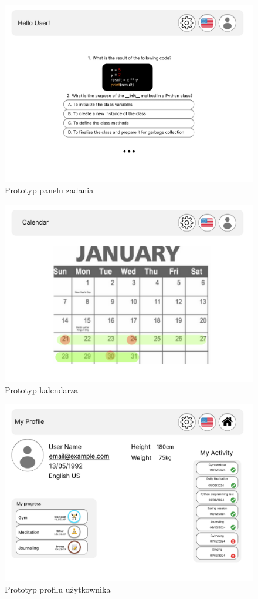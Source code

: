 \begin{figure}[h]
    \centering
    \includegraphics[width=1\textwidth]{Obrazy/prototypy/panel_zadania.png}
    \caption{Prototyp panelu zadania}
    \label{fig:my_label}
\end{figure}

\begin{figure}[h]
    \centering
    \includegraphics[width=1\textwidth]{Obrazy/prototypy/kalendarz.png}
    \caption{Prototyp kalendarza}
    \label{fig:my_label}
\end{figure}

\begin{figure}[h]
    \centering
    \includegraphics[width=1\textwidth]{Obrazy/prototypy/profil_uzytkownika.png}
    \caption{Prototyp profilu użytkownika}
    \label{fig:my_label}
\end{figure}

\clearpage
